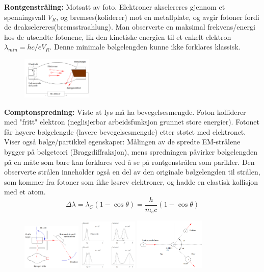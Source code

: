 \documentclass[10p,a4paper]{article}
\begin{document}
\textbf{Rontgenstråling:} Motsatt av foto. Elektroner akselereres gjennom et spenningsvall $V_R$, og bremses(koliderer) mot en metallplate, og avgir fotoner fordi de deakselereres(bremsstraahlung). Man observerte en maksimal frekvens/energi hos de utsendte fotonene, lik den kinetiske energien til et enkelt elektron $\lambda_{min} = hc/eV_R$. Denne minimale bølgelengden kunne ikke forklares klassisk.
\begin{figure}[H]
\centering
\includegraphics[width=0.3\textwidth]{rontgen.png}
\end{figure}


\textbf{Comptonspredning:} Viste at lys må ha bevegelsesmengde. Foton kolliderer med "fritt" elektron (neglisjerbar arbeidsfunksjon grunnet store energier). Fotonet får høyere bølgelengde (lavere bevegelsesmengde) etter støtet med elektronet. Viser også bølge/partikkel egenskaper: Målingen av de spredte EM-strålene bygger på bølgeteori (Braggdiffraksjon), mens spredningen påvirker bølgelengden på en måte som bare kan forklares ved å se på rontgenstrålen som parikler. Den observerte strålen inneholder også en del av den originale bølgelengden til strålen, som kommer fra fotoner som ikke løsrev elektroner, og hadde en elastisk kollisjon med et atom.
\[ \Delta \lambda = \lambda_C (1-\cos\theta) = \frac{h}{m_ec}(1-\cos\theta) \]

\begin{figure}[H]
\includegraphics[width=0.25\textwidth]{compton.png}
\includegraphics[width=0.25\textwidth]{compton2.png}
\includegraphics[width=0.3\textwidth]{compton3.png}
\end{figure}
\end{document}

